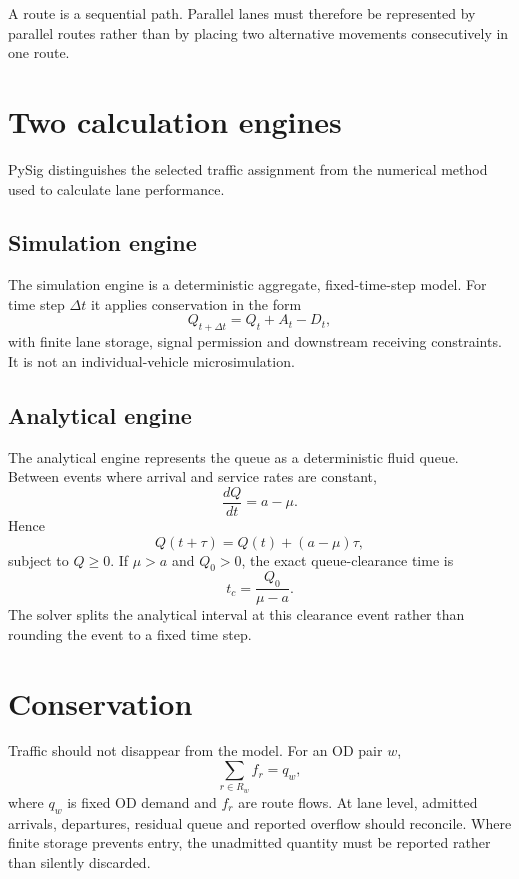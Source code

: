 A route is a sequential path.  Parallel lanes must therefore be represented by
parallel routes rather than by placing two alternative movements consecutively in one
route.

\section{Two calculation engines}
PySig distinguishes the selected traffic assignment from the numerical method used to
calculate lane performance.

\subsection{Simulation engine}
The simulation engine is a deterministic aggregate, fixed-time-step model.  For time
step $\Delta t$ it applies conservation in the form
\begin{equation}
Q_{t+\Delta t}=Q_t+A_t-D_t,
\end{equation}
with finite lane storage, signal permission and downstream receiving constraints.
It is not an individual-vehicle microsimulation.

\subsection{Analytical engine}
The analytical engine represents the queue as a deterministic fluid queue.  Between
events where arrival and service rates are constant,
\begin{equation}
\frac{dQ}{dt}=a-\mu.
\end{equation}
Hence
\begin{equation}
Q(t+\tau)=Q(t)+(a-\mu)\tau,
\end{equation}
subject to $Q\geq0$.  If $\mu>a$ and $Q_0>0$, the exact queue-clearance time is
\begin{equation}
t_c=\frac{Q_0}{\mu-a}.
\end{equation}
The solver splits the analytical interval at this clearance event rather than rounding
the event to a fixed time step.

\section{Conservation}
Traffic should not disappear from the model.  For an OD pair $w$,
\begin{equation}
\sum_{r\in R_w} f_r=q_w,
\end{equation}
where $q_w$ is fixed OD demand and $f_r$ are route flows.  At lane level, admitted
arrivals, departures, residual queue and reported overflow should reconcile.  Where
finite storage prevents entry, the unadmitted quantity must be reported rather than
silently discarded.

